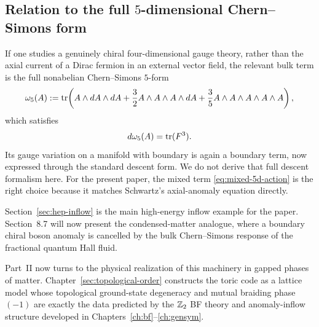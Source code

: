\subsection{Relation to the full \texorpdfstring{$5$}{5}-dimensional Chern--Simons form}

\begin{remark}\label{rem:full-cs5-story}
If one studies a genuinely chiral four-dimensional gauge theory, rather than the axial current of a Dirac fermion in an external vector field, the relevant bulk term is the full nonabelian Chern--Simons $5$-form
\begin{equation}\label{eq:cs5-full}
\omega_5(A)
:=
\operatorname{tr}\!\left(
A\wedge dA\wedge dA
+\frac{3}{2}A\wedge A\wedge A\wedge dA
+\frac{3}{5}A\wedge A\wedge A\wedge A\wedge A
\right),
\end{equation}
which satisfies
\begin{equation*}
d\omega_5(A)=\operatorname{tr}(F^3).
\end{equation*}
Its gauge variation on a manifold with boundary is again a boundary term, now expressed through the standard descent form. We do not derive that full descent formalism here. For the present paper, the mixed term \eqref{eq:mixed-5d-action} is the right choice because it matches Schwartz's axial-anomaly equation directly.
\end{remark}

\begin{remark}\label{rem:hep-to-cm-forward}
Section~\ref{sec:hep-inflow} is the main high-energy inflow example for the paper. Section~8.7 will now present the condensed-matter analogue, where a boundary chiral boson anomaly is cancelled by the bulk Chern--Simons response of the fractional quantum Hall fluid.
\end{remark}

\medskip

\noindent Part~II now turns to the physical realization of this machinery in gapped phases of matter. Chapter~\ref{sec:topological-order} constructs the toric code as a lattice model whose topological ground-state degeneracy and mutual braiding phase $(-1)$ are exactly the data predicted by the $\mathbb{Z}_2$ BF theory and anomaly-inflow structure developed in Chapters~\ref{ch:bf}--\ref{ch:gensym}.
